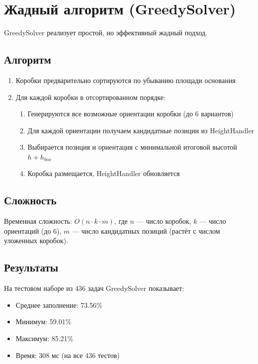\section{Жадный алгоритм (GreedySolver)}

GreedySolver реализует простой, но эффективный жадный подход.

\subsection{Алгоритм}

\begin{enumerate}
    \item Коробки предварительно сортируются по убыванию площади основания
    \item Для каждой коробки в отсортированном порядке:
    \begin{enumerate}
        \item Генерируются все возможные ориентации коробки (до 6 вариантов)
        \item Для каждой ориентации получаем кандидатные позиции из HeightHandler
        \item Выбирается позиция и ориентация с минимальной итоговой высотой $h + h_{box}$
        \item Коробка размещается, HeightHandler обновляется
    \end{enumerate}
\end{enumerate}

\subsection{Сложность}

Временная сложность: $O(n \cdot k \cdot m)$, где $n$ --- число коробок, $k$ --- число ориентаций (до 6), $m$ --- число кандидатных позиций (растёт с числом уложенных коробок).

\subsection{Результаты}

На тестовом наборе из 436 задач GreedySolver показывает:
\begin{itemize}
    \item Среднее заполнение: 73.56\%
    \item Минимум: 59.01\%
    \item Максимум: 85.21\%
    \item Время: 308 мс (на все 436 тестов)
\end{itemize}

